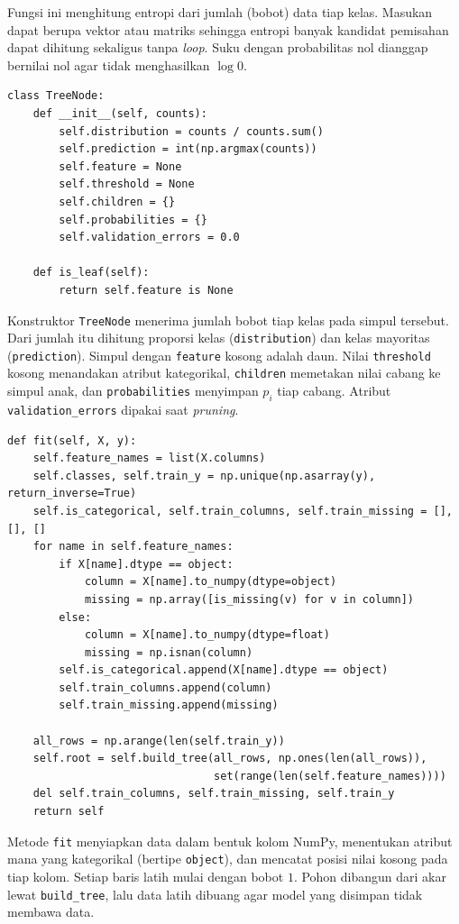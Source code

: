 Fungsi ini menghitung entropi dari jumlah (bobot) data tiap kelas. Masukan
dapat berupa vektor atau matriks sehingga entropi banyak kandidat pemisahan
dapat dihitung sekaligus tanpa \textit{loop}. Suku dengan probabilitas nol
dianggap bernilai nol agar tidak menghasilkan $\log 0$.

\begin{lstlisting}
class TreeNode:
    def __init__(self, counts):
        self.distribution = counts / counts.sum()
        self.prediction = int(np.argmax(counts))
        self.feature = None
        self.threshold = None
        self.children = {}
        self.probabilities = {}
        self.validation_errors = 0.0

    def is_leaf(self):
        return self.feature is None
\end{lstlisting}

Konstruktor \texttt{TreeNode} menerima jumlah bobot tiap kelas pada simpul
tersebut. Dari jumlah itu dihitung proporsi kelas (\texttt{distribution}) dan
kelas mayoritas (\texttt{prediction}). Simpul dengan \texttt{feature} kosong
adalah daun. Nilai \texttt{threshold} kosong menandakan atribut kategorikal,
\texttt{children} memetakan nilai cabang ke simpul anak, dan
\texttt{probabilities} menyimpan $p_i$ tiap cabang. Atribut
\texttt{validation\_errors} dipakai saat \textit{pruning}.

\begin{lstlisting}
def fit(self, X, y):
    self.feature_names = list(X.columns)
    self.classes, self.train_y = np.unique(np.asarray(y), return_inverse=True)
    self.is_categorical, self.train_columns, self.train_missing = [], [], []
    for name in self.feature_names:
        if X[name].dtype == object:
            column = X[name].to_numpy(dtype=object)
            missing = np.array([is_missing(v) for v in column])
        else:
            column = X[name].to_numpy(dtype=float)
            missing = np.isnan(column)
        self.is_categorical.append(X[name].dtype == object)
        self.train_columns.append(column)
        self.train_missing.append(missing)

    all_rows = np.arange(len(self.train_y))
    self.root = self.build_tree(all_rows, np.ones(len(all_rows)),
                                set(range(len(self.feature_names))))
    del self.train_columns, self.train_missing, self.train_y
    return self
\end{lstlisting}

Metode \texttt{fit} menyiapkan data dalam bentuk kolom NumPy, menentukan
atribut mana yang kategorikal (bertipe \texttt{object}), dan mencatat posisi
nilai kosong pada tiap kolom. Setiap baris latih mulai dengan bobot $1$. Pohon
dibangun dari akar lewat \texttt{build\_tree}, lalu data latih dibuang agar
model yang disimpan tidak membawa data.

